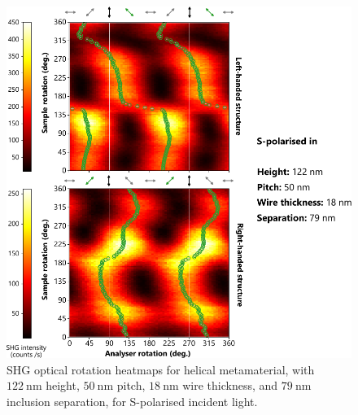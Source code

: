 \begin{figure}[htb!]	
    \centering	
    \includegraphics[scale=1]{./figures/results/OAinPlanarNanohelices/8_s_data.pdf}
    \caption{\label{fig:results:OAinPlanarNanohelices:8_s_data}
    SHG optical rotation heatmaps for helical metamaterial, with $\SI{122}{\nano\m}$ height, $\SI{50}{\nano\m}$ pitch, $\SI{18}{\nano\m}$ wire thickness, and $\SI{79}{\nano\m}$ inclusion separation, for S-polarised incident light.}	
\end{figure}

